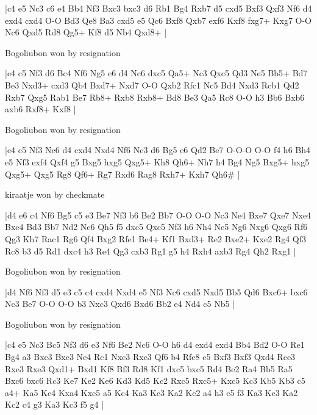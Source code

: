 \makegametitle
|c4 e5 Nc3 c6 e4 Bb4 Nf3 Bxc3 bxc3 d6 Rb1 Bg4 Rxb7 d5 cxd5 Bxf3 Qxf3 Nf6 d4 exd4 cxd4 O-O Bd3 Qe8 Ba3 cxd5 e5 Qc6 Bxf8 Qxb7 exf6 Kxf8 fxg7+ Kxg7 O-O Nc6 Qxd5 Rd8 Qg5+ Kf8 d5 Nb4 Qxd8+  |

\showboard

Bogoliubon won by resignation

\makegametitle
|e4 c5 Nf3 d6 Bc4 Nf6 Ng5 e6 d4 Nc6 dxc5 Qa5+ Nc3 Qxc5 Qd3 Ne5 Bb5+ Bd7 Be3 Nxd3+ cxd3 Qb4 Bxd7+ Nxd7 O-O Qxb2 Rfc1 Nc5 Bd4 Nxd3 Rcb1 Qd2 Rxb7 Qxg5 Rab1 Be7 Rb8+ Rxb8 Rxb8+ Bd8 Be3 Qa5 Rc8 O-O h3 Bb6 Bxb6 axb6 Rxf8+ Kxf8  |

\showboard

Bogoliubon won by resignation

\makegametitle
|e4 c5 Nf3 Nc6 d4 cxd4 Nxd4 Nf6 Nc3 d6 Bg5 e6 Qd2 Be7 O-O-O O-O f4 h6 Bh4 e5 Nf3 exf4 Qxf4 g5 Bxg5 hxg5 Qxg5+ Kh8 Qh6+ Nh7 h4 Bg4 Ng5 Bxg5+ hxg5 Qxg5+ Qxg5 Rg8 Qf6+ Rg7 Rxd6 Rag8 Rxh7+ Kxh7 Qh6\#  |

\showboard

kiraatje won by checkmate

\makegametitle
|d4 e6 c4 Nf6 Bg5 c5 e3 Be7 Nf3 b6 Be2 Bb7 O-O O-O Nc3 Ne4 Bxe7 Qxe7 Nxe4 Bxe4 Bd3 Bb7 Nd2 Nc6 Qh5 f5 dxc5 Qxc5 Nf3 h6 Nh4 Ne5 Ng6 Nxg6 Qxg6 Rf6 Qg3 Kh7 Rac1 Rg6 Qf4 Bxg2 Rfe1 Be4+ Kf1 Bxd3+ Re2 Bxe2+ Kxe2 Rg4 Qf3 Rc8 b3 d5 Rd1 dxc4 h3 Re4 Qg3 cxb3 Rg1 g5 h4 Rxh4 axb3 Rg4 Qh2 Rxg1  |

\showboard

Bogoliubon won by resignation

\makegametitle
|d4 Nf6 Nf3 d5 e3 c5 c4 cxd4 Nxd4 e5 Nf3 Nc6 cxd5 Nxd5 Bb5 Qd6 Bxc6+ bxc6 Nc3 Be7 O-O O-O b3 Nxc3 Qxd6 Bxd6 Bb2 e4 Nd4 c5 Nb5  |

\showboard

Bogoliubon won by resignation

\makegametitle
|c4 e5 Nc3 Bc5 Nf3 d6 e3 Nf6 Be2 Nc6 O-O h6 d4 exd4 exd4 Bb4 Bd2 O-O Re1 Bg4 a3 Bxc3 Bxc3 Ne4 Rc1 Nxc3 Rxc3 Qf6 b4 Rfe8 c5 Bxf3 Bxf3 Qxd4 Rce3 Rxe3 Rxe3 Qxd1+ Bxd1 Kf8 Bf3 Rd8 Kf1 dxc5 bxc5 Rd4 Be2 Ra4 Bb5 Ra5 Bxc6 bxc6 Rc3 Ke7 Ke2 Ke6 Kd3 Kd5 Kc2 Rxc5 Rxc5+ Kxc5 Kc3 Kb5 Kb3 c5 a4+ Ka5 Kc4 Kxa4 Kxc5 a5 Kc4 Ka3 Kc3 Ka2 Kc2 a4 h3 c5 f3 Ka3 Kc3 Ka2 Kc2 c4 g3 Ka3 Kc3 f5 g4  |

